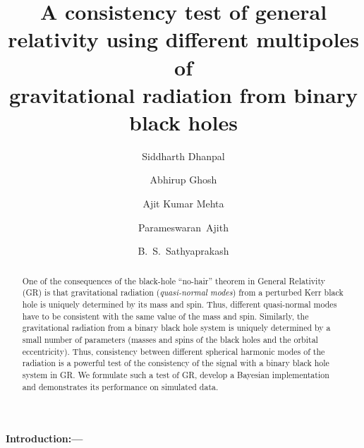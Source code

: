 \documentclass[prl,preprintnumbers,twocolumn,eqsecnum,floatfix,a4paper,nofootinbib,superscriptaddress]{revtex4}
\begin{document}
\title{A consistency test of general relativity using different multipoles of \\gravitational radiation from binary black holes}
\author{Siddharth Dhanpal}
\author{Abhirup Ghosh}
\author{Ajit Kumar Mehta}
\author{Parameswaran~Ajith}
\author{B.~S.~Sathyaprakash}

\begin{abstract}
One of the consequences of the black-hole ``no-hair'' theorem in General Relativity (GR) is that gravitational radiation (\emph{quasi-normal modes}) from a perturbed Kerr black hole is uniquely determined by its mass and spin. Thus, different quasi-normal modes have to be consistent with the same value of the mass and spin. Similarly, the gravitational radiation from a binary black hole system is uniquely determined by a small number of parameters (masses and spins of the black holes and the orbital eccentricity). Thus, consistency between different spherical harmonic modes of the radiation is a powerful test of the consistency of the signal with a binary black hole system in GR. We formulate such a test of GR, develop a Bayesian implementation and demonstrates its performance on simulated data. 
\end{abstract}
\maketitle
\paragraph{Introduction:---}
\end{document}
